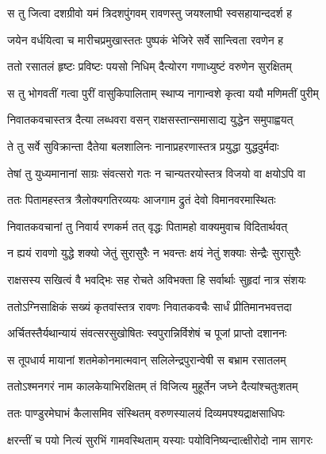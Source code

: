 
\twolineshloka
{स तु जित्वा दशग्रीवो यमं त्रिदशपुंगवम्}
{रावणस्तु जयश्लाघी स्वसहायान्ददर्श ह} %

\twolineshloka
{जयेन वर्धयित्वा च मारीचप्रमुखास्ततः}
{पुष्पकं भेजिरे सर्वे सान्त्विता रवणेन ह} %

\twolineshloka
{ततो रसातलं हृष्टः प्रविष्टः पयसो निधिम्}
{दैत्योरग गणाध्युष्टं वरुणेन सुरक्षितम्} %

\twolineshloka
{स तु भोगवतीं गत्वा पुरीं वासुकिपालिताम्}
{स्थाप्य नागान्वशे कृत्वा ययौ मणिमतीं पुरीम्} %

\twolineshloka
{निवातकवचास्तत्र दैत्या लब्धवरा वसन्}
{राक्षसस्तान्समासाद्य युद्धेन समुपाह्वयत्} %

\twolineshloka
{ते तु सर्वे सुविक्रान्ता दैतेया बलशालिनः}
{नानाप्रहरणास्तत्र प्रयुद्धा युद्धदुर्मदाः} %

\twolineshloka
{तेषां तु युध्यमानानां साग्रः संवत्सरो गतः}
{न चान्यतरयोस्तत्र विजयो वा क्षयोऽपि वा} %

\twolineshloka
{ततः पितामहस्तत्र त्रैलोक्यगतिरव्ययः}
{आजगाम द्रुतं देवो विमानवरमास्थितः} %

\twolineshloka
{निवातकवचानां तु निवार्य रणकर्म तत्}
{वृद्धः पितामहो वाक्यमुवाच विदितार्थवत्} %

\twolineshloka
{न ह्ययं रावणो युद्धे शक्यो जेतुं सुरासुरैः}
{न भवन्तः क्षयं नेतुं शक्याः सेन्द्रैः सुरासुरैः} %

\twolineshloka
{राक्षसस्य सखित्वं वै भवद्भिः सह रोचते}
{अविभक्ता हि सर्वार्थाः सुहृदां नात्र संशयः} %

\twolineshloka
{ततोऽग्निसाक्षिकं सख्यं कृतवांस्तत्र रावणः}
{निवातकवचैः सार्धं प्रीतिमानभवत्तदा} %

\twolineshloka
{अर्चितस्तैर्यथान्यायं संवत्सरसुखोषितः}
{स्वपुरान्निर्विशेषं च पूजां प्राप्तो दशाननः} %

\twolineshloka
{स तूपधार्य मायानां शतमेकोनमात्मवान्}
{सलिलेन्द्रपुरान्वेषी स बभ्राम रसातलम्} %

\twolineshloka
{ततोऽश्मनगरं नाम कालकेयाभिरक्षितम्}
{तं विजित्य मुहूर्तेन जघ्ने दैत्यांश्चतुःशतम्} %

\twolineshloka
{ततः पाण्डुरमेघाभं कैलासमिव संस्थितम्}
{वरुणस्यालयं दिव्यमपश्यद्राक्षसाधिपः} %

\twolineshloka
{क्षरन्तीं च पयो नित्यं सुरभिं गामवस्थिताम्}
{यस्याः पयोविनिष्यन्दात्क्षीरोदो नाम सागरः} %

